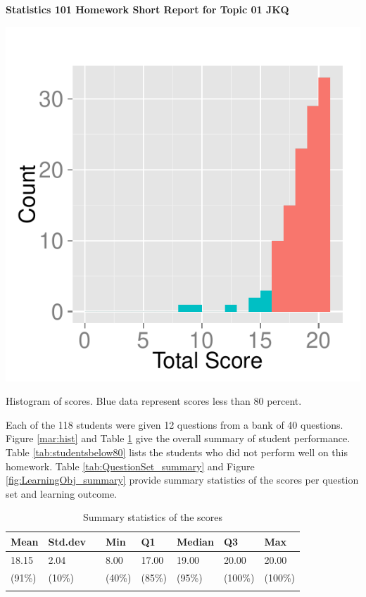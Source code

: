 \documentclass[12pt,english,nohyper]{tufte-handout}\usepackage[]{graphicx}\usepackage[]{color}
\begin{document}
\centerline{\Large\bf Statistics 101 Homework Short Report for Topic 01 JKQ}
\vspace{1cm}

\begin{marginfigure}
\includegraphics[width=0.98\linewidth]{Topic01_JKQ_score}
\caption{\label{mar:hist}Histogram of scores. Blue data represent scores less than 80 percent.}
\end{marginfigure}

Each of the 118 students were given 12 questions from a bank of 40 questions. Figure \ref{mar:hist} and Table \ref{tab:summary} give the overall summary of student performance. Table \ref{tab:studentsbelow80} lists the students who did not perform well on this homework. Table \ref{tab:QuestionSet_summary} and Figure \ref{fig:LearningObj_summary} provide summary statistics of the scores per question set and learning outcome.
\bigskip{}

\begin{longtable}{llllllll}
  \hline
Mean & Std.dev &   & Min & Q1 & Median & Q3 & Max \\ 
  \hline
18.15 & 2.04 &  & 8.00 & 17.00 & 19.00 & 20.00 & 20.00 \\ 
  (91\%) & (10\%) &  & (40\%) & (85\%) & (95\%) & (100\%) & (100\%) \\ 
   \hline
\hline
\caption{Summary statistics of the scores} 
\label{tab:summary}
\end{longtable}
\end{document}
